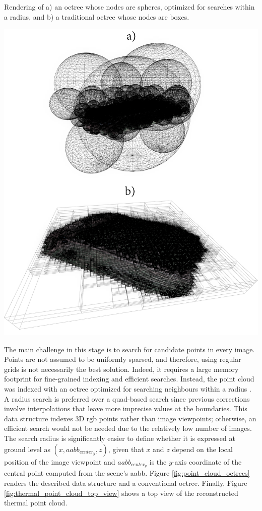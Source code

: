 \begin{marginfigure}[.0cm]
	\caption{Rendering of a) an octree whose nodes are spheres, optimized for searches within a radius, and b) a traditional octree whose nodes are boxes. }
	\label{fig:point_cloud_octrees}
	\includegraphics{figs/thermal_projection/octrees.png}
\end{marginfigure}
The main challenge in this stage is to search for candidate points in every image. Points are not assumed to be uniformly sparsed, and therefore, using regular grids is not necessarily the best solution. Indeed, it requires a large memory footprint for fine-grained indexing and efficient searches. Instead, the point cloud was indexed with an octree optimized for searching neighbours within a radius \cite{behley_efficient_2015}. A radius search is preferred over a quad-based search since previous corrections involve interpolations that leave more imprecise values at the boundaries. This data structure indexes 3D \acrshort{rgb} points rather than image viewpoints; otherwise, an efficient search would not be needed due to the relatively low number of images. The search radius is significantly easier to define whether it is expressed at ground level as $(x, \textit{aabb}_{\textit{center}_{y}}, z)$, given that $x$ and $z$ depend on the local position of the image viewpoint and $\textit{aabb}_{\textit{center}_{y}}$ is the $y$-axis coordinate of the central point computed from the scene's \acrshort{aabb}. Figure \ref{fig:point_cloud_octrees} renders the described data structure and a conventional octree. Finally, Figure \ref{fig:thermal_point_cloud_top_view} shows a top view of the reconstructed thermal point cloud.

